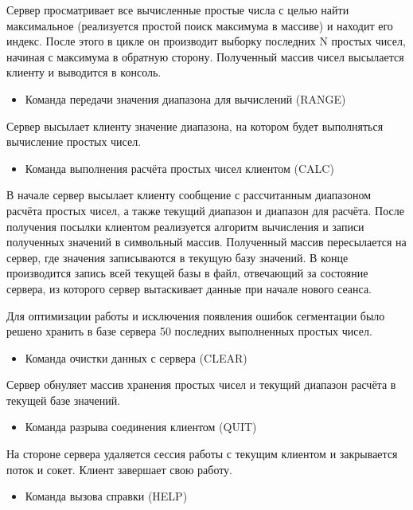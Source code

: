 Сервер просматривает все вычисленные простые числа с целью найти максимальное (реализуется простой поиск максимума в массиве) и находит его индекс. После этого в цикле он производит выборку последних N простых чисел, начиная с максимума в обратную сторону. Полученный массив чисел высылается клиенту и выводится в консоль.

\begin{itemize}
	\item Команда передачи значения диапазона для вычислений (RANGE)
\end{itemize}

Сервер высылает клиенту значение диапазона, на котором будет выполняться вычисление простых чисел.

\begin{itemize}
	\item Команда выполнения расчёта простых чисел клиентом (CALC)
\end{itemize}

В начале сервер высылает клиенту сообщение с рассчитанным диапазоном расчёта простых чисел, а также текущий диапазон и диапазон для расчёта. После получения посылки клиентом реализуется алгоритм вычисления и записи полученных значений в символьный массив. Полученный массив пересылается на сервер, где значения записываются в текущую базу значений. В конце производится запись всей текущей базы в файл, отвечающий за состояние сервера, из которого сервер вытаскивает данные при начале нового сеанса.

Для оптимизации работы и исключения появления ошибок сегментации было решено хранить в базе сервера 50 последних выполненных простых чисел.

\begin{itemize}
	\item Команда очистки данных с сервера (CLEAR)
\end{itemize}

Сервер обнуляет массив хранения простых чисел и текущий диапазон расчёта в текущей базе значений.

\begin{itemize}
	\item Команда разрыва соединения клиентом (QUIT)
\end{itemize}

На стороне сервера удаляется сессия работы с текущим клиентом и закрывается поток и сокет. Клиент завершает свою работу.

\begin{itemize}
	\item Команда вызова справки (HELP)
\end{itemize}

